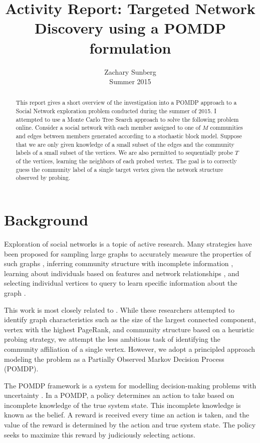 \documentclass{IEEEtran}
\title{Activity Report: Targeted Network Discovery using a POMDP formulation}
\author{Zachary Sunberg\\Summer 2015}
\begin{document}
\maketitle

\begin{abstract}
This report gives a short overview of the investigation into a POMDP approach to a Social Network exploration problem conducted during the summer of 2015. I attempted to use a Monte Carlo Tree Search approach to solve the following problem online. Consider a social network with each member assigned to one of $M$ communities and edges between members generated according to a stochastic block model. Suppose that we are only given knowledge of a small subset of the edges and the community labels of a small subset of the vertices. We are also permitted to sequentially probe $T$ of the vertices, learning the neighbors of each probed vertex. The goal is to correctly guess the community label of a single target vertex given the network structure observed by probing.
\end{abstract}

\section{Background}

Exploration of social networks is a topic of active research. Many strategies have been proposed for sampling large graphs to accurately measure the properties of such graphs \cite{Leskovec2006, Seshadhri2014},
inferring community structure with incomplete information \cite{Caceres2014, Liu2015, Maiya2010, Yun2014},
learning about individuals based on features and network relationships \cite{Bilgic2010, Iii2012}, and selecting individual vertices to query to learn specific information about the graph \cite{Wang2013, Soundarajan2014}.

This work is most closely related to \cite{Soundarajan2014}. While these researchers attempted to identify graph characteristics such as the size of the largest connected component, vertex with the highest PageRank, and community structure based on a heuristic probing strategy, we attempt the less ambitious task of identifying the community affiliation of a single vertex. However, we adopt a principled approach modeling the problem as a Partially Observed Markov Decision Process (POMDP).

The POMDP framework is a system for modelling decision-making problems with uncertainty \cite{Kochenderfer2015}. In a POMDP, a policy determines an action to take based on incomplete knowledge of the true system state. This incomplete knowledge is known as the belief. A reward is received every time an action is taken, and the value of the reward is determined by the action and true system state. The policy seeks to maximize this reward by judiciously selecting actions.
\end{document}
